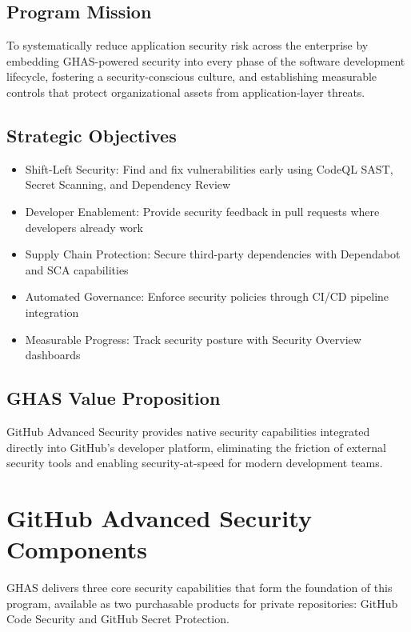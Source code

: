 \documentclass[11pt]{article}
\begin{document}
\subsection{Program Mission}

To systematically reduce application security risk across the enterprise by embedding GHAS-powered security into every phase of the software development lifecycle, fostering a security-conscious culture, and establishing measurable controls that protect organizational assets from application-layer threats.

\subsection{Strategic Objectives}

\begin{itemize}[leftmargin=*]
\item Shift-Left Security: Find and fix vulnerabilities early using CodeQL SAST, Secret Scanning, and Dependency Review
\item Developer Enablement: Provide security feedback in pull requests where developers already work
\item Supply Chain Protection: Secure third-party dependencies with Dependabot and SCA capabilities
\item Automated Governance: Enforce security policies through CI/CD pipeline integration
\item Measurable Progress: Track security posture with Security Overview dashboards
\end{itemize}
\subsection{GHAS Value Proposition}

GitHub Advanced Security provides native security capabilities integrated directly into GitHub's developer platform, eliminating the friction of external security tools and enabling security-at-speed for modern development teams.

\section{GitHub Advanced Security Components}

GHAS delivers three core security capabilities that form the foundation of this program, available as two purchasable products for private repositories: GitHub Code Security and GitHub Secret Protection.
\end{document}
